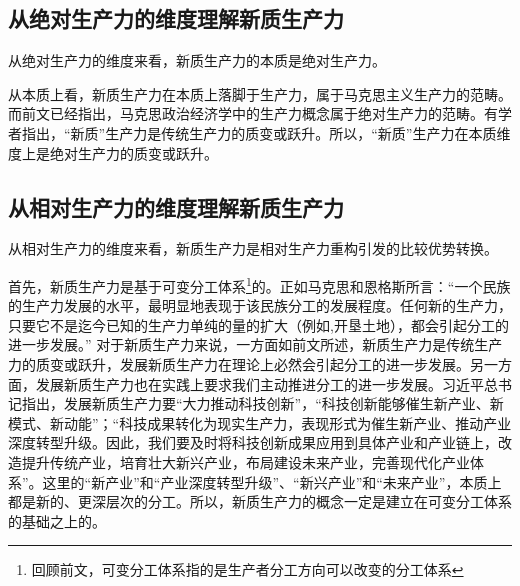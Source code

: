 \subsection{从绝对生产力的维度理解新质生产力}

从绝对生产力的维度来看，新质生产力的本质是绝对生产力。

从本质上看，新质生产力在本质上落脚于生产力\cite[138]{ZhangLinXinZhiShengChanLiDeNeiHanTeZhengLiLunChuangXinYuJieZhiYiYun2023}，属于马克思主义生产力的范畴\cite[7]{RenBaoPingXinZhiShengChanLiWenXianZongShuYuYanJiuZhanWang2024}\cite[2-4]{ZhouWenLunXinZhiShengChanLiNeiHanTeZhengYuChongYaoZhaoLiDian2023}\cite[129]{GaoFanXinZhiShengChanLiDeTiChuLuoJiDuoWeiNeiHanJiShiDaiYiYi2023}\cite[1-2]{PuQingPingXiJinPingZongShuJiGuanYuXinZhiShengChanLiChongYaoLunShuDeShengChengLuoJiLiLunChuangXinYuShiDaiJieZhi2023}\cite[15-16]{RenBaoPingShengChanLiXianDaiHuaZhuanXingXingChengXinZhiShengChanLiDeLuoJi2024}。而前文已经指出，马克思政治经济学中的生产力概念属于绝对生产力的范畴。有学者指出，“新质”生产力是传统生产力的质变或跃升\cite[3]{ZhouWenLunXinZhiShengChanLiNeiHanTeZhengYuChongYaoZhaoLiDian2023}\cite[143]{ZhangLinXinZhiShengChanLiDeNeiHanTeZhengLiLunChuangXinYuJieZhiYiYun2023}\cite[52]{XuZhengXinZhiShengChanLiFuNengGaoZhiLiangFaZhanDeNeiZaiLuoJiYuShiJianGouXiang2023}\cite[2]{PuQingPingXiJinPingZongShuJiGuanYuXinZhiShengChanLiChongYaoLunShuDeShengChengLuoJiLiLunChuangXinYuShiDaiJieZhi2023}\cite[13]{RenBaoPingShengChanLiXianDaiHuaZhuanXingXingChengXinZhiShengChanLiDeLuoJi2024}\cite[6]{RenBaoPingXinZhiShengChanLiWenXianZongShuYuYanJiuZhanWang2024}。所以，“新质”生产力在本质维度上是绝对生产力的质变或跃升。

\subsection{从相对生产力的维度理解新质生产力}

从相对生产力的维度来看，新质生产力是相对生产力重构引发的比较优势转换。

首先，新质生产力是基于可变分工体系\footnote{回顾前文，可变分工体系指的是生产者分工方向可以改变的分工体系}的。正如马克思和恩格斯所言：“一个民族的生产力发展的水平，最明显地表现于该民族分工的发展程度。任何新的生产力，只要它不是迄今已知的生产力单纯的量的扩大（例如,开垦土地），都会引起分工的进一步发展。” \cite[520]{ZhongGongZhongYangMaKeSiEnGeSiLieNingSiDaLinZhuZuoBianYiJuMaKeSiEnGeSiWenJiDi1Juan2009}对于新质生产力来说，一方面如前文所述，新质生产力是传统生产力的质变或跃升，发展新质生产力在理论上必然会引起分工的进一步发展\cite[141]{ZhangLinXinZhiShengChanLiDeNeiHanTeZhengLiLunChuangXinYuJieZhiYiYun2023}。另一方面，发展新质生产力也在实践上要求我们主动推进分工的进一步发展。习近平总书记指出，发展新质生产力要“大力推动科技创新”，“科技创新能够催生新产业、新模式、新动能”\cite[516]{XiJinPingXiJinPingJingJiWenXuanDiYiJuan2025}；“科技成果转化为现实生产力，表现形式为催生新产业、推动产业深度转型升级。因此，我们要及时将科技创新成果应用到具体产业和产业链上，改造提升传统产业，培育壮大新兴产业，布局建设未来产业，完善现代化产业体系”。\cite[516]{XiJinPingXiJinPingJingJiWenXuanDiYiJuan2025}这里的“新产业”和“产业深度转型升级”、“新兴产业”和“未来产业”，本质上都是新的、更深层次的分工。所以，新质生产力的概念一定是建立在可变分工体系的基础之上的。

